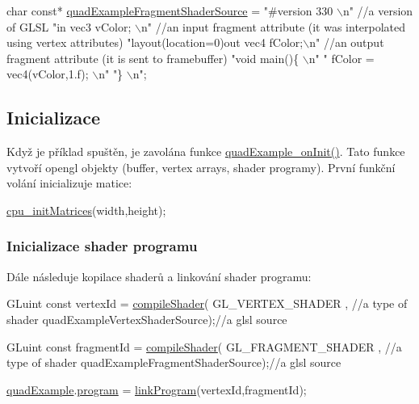 \begin{DoxyCodeInclude}
\textcolor{keywordtype}{char} \textcolor{keyword}{const}* \hyperlink{quadExample_8c_a0ac50d89d2665b7f77595f36071c8ffc}{quadExampleFragmentShaderSource} = 
\textcolor{stringliteral}{"#version 330                      \(\backslash\)n"} \textcolor{comment}{//a version of GLSL}
\textcolor{comment}{}\textcolor{stringliteral}{"in vec3 vColor;                   \(\backslash\)n"} \textcolor{comment}{//an input fragment attribute (it was interpolated using vertex
       attributes)}
\textcolor{comment}{}\textcolor{stringliteral}{"layout(location=0)out vec4 fColor;\(\backslash\)n"} \textcolor{comment}{//an output fragment attribute (it is sent to framebuffer)}
\textcolor{comment}{}\textcolor{stringliteral}{"void main()\{                      \(\backslash\)n"}
\textcolor{stringliteral}{"  fColor = vec4(vColor,1.f);      \(\backslash\)n"}
\textcolor{stringliteral}{"\}                                 \(\backslash\)n"};
\end{DoxyCodeInclude}
\hypertarget{quadExample.c_Initialization}{}\subsection{Inicializace}\label{quadExample.c_Initialization}
Když je příklad spuštěn, je zavolána funkce \hyperlink{quadExample_8c_ae9e7b1446d0269014f3f3d33df3f0da0}{quad\-Example\-\_\-on\-Init()}. Tato funkce vytvoří opengl objekty (buffer, vertex arrays, shader programy). První funkční volání inicializuje matice\-: 
\begin{DoxyCodeInclude}
  \hyperlink{mouseCamera_8c_a7e7e918a9328502b7c35cfbbdb068b7b}{cpu\_initMatrices}(width,height);
\end{DoxyCodeInclude}
\hypertarget{quadExample.c_ShaderProgram}{}\subsubsection{Inicializace shader programu}\label{quadExample.c_ShaderProgram}
Dále následuje kopilace shaderů a linkování shader programu\-: 
\begin{DoxyCodeInclude}
  GLuint \textcolor{keyword}{const} vertexId = \hyperlink{program_8h_aeeb65abe90cc1be97e5788afe8ca57a7}{compileShader}(
      GL\_VERTEX\_SHADER             , \textcolor{comment}{//a type of shader}
      quadExampleVertexShaderSource);\textcolor{comment}{//a glsl source}

  GLuint \textcolor{keyword}{const} fragmentId = \hyperlink{program_8h_aeeb65abe90cc1be97e5788afe8ca57a7}{compileShader}(
      GL\_FRAGMENT\_SHADER             , \textcolor{comment}{//a type of shader}
      quadExampleFragmentShaderSource);\textcolor{comment}{//a glsl source}

  \hyperlink{quadExample_8c_ad961415145a9c30bd9846d4a278cc63a}{quadExample}.\hyperlink{structQuadExampleVariables_a63971781ff860bd201886926f943ba78}{program} = \hyperlink{program_8h_af917a75fb9e573fb52d85ef90f32231e}{linkProgram}(vertexId,fragmentId);
\end{DoxyCodeInclude}
